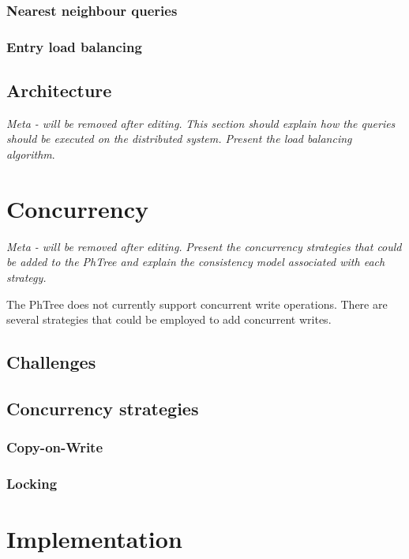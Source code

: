 \documentclass[11pt,a4paper]{globis-book}
\begin{document}
\subsection{Nearest neighbour queries}

\subsection{Entry load balancing}

\section{Architecture}
\label{sec:distindex-architectures}

\textit{Meta - will be removed after editing.}
\textit{This section should explain how the queries should be executed on the distributed system. Present the load balancing algorithm}.

\chapter{Concurrency}
\label{ch:concurrency}

\textit{Meta - will be removed after editing.}
\textit{Present the concurrency strategies that could be added to the PhTree and explain the consistency model associated with each strategy.}

The PhTree does not currently support concurrent write operations. There are several strategies that could be employed to add concurrent writes.

\section{Challenges}

\section{Concurrency strategies}

\subsection{Copy-on-Write}

\subsection{Locking}

\chapter{Implementation}
\label{ch:implementation}
\end{document}
